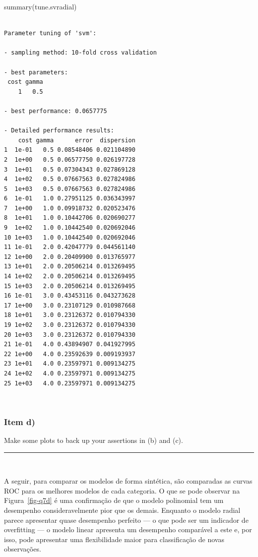 \documentclass[
  a4paperpaper,
]{article}
\newenvironment{Shaded}{\begin{snugshade}}{\end{snugshade}}
\newcommand{\FunctionTok}[1]{\textcolor[rgb]{0.28,0.35,0.67}{#1}}
\newcommand{\NormalTok}[1]{\textcolor[rgb]{0.00,0.23,0.31}{#1}}
\begin{document}
\begin{Shaded}
\begin{Highlighting}[]
\FunctionTok{summary}\NormalTok{(tune.svradial)}
\end{Highlighting}
\end{Shaded}

\begin{verbatim}

Parameter tuning of 'svm':

- sampling method: 10-fold cross validation 

- best parameters:
 cost gamma
    1   0.5

- best performance: 0.0657775 

- Detailed performance results:
    cost gamma      error  dispersion
1  1e-01   0.5 0.08548406 0.021104890
2  1e+00   0.5 0.06577750 0.026197728
3  1e+01   0.5 0.07304343 0.027869128
4  1e+02   0.5 0.07667563 0.027824986
5  1e+03   0.5 0.07667563 0.027824986
6  1e-01   1.0 0.27951125 0.036343997
7  1e+00   1.0 0.09918732 0.020523476
8  1e+01   1.0 0.10442706 0.020690277
9  1e+02   1.0 0.10442540 0.020692046
10 1e+03   1.0 0.10442540 0.020692046
11 1e-01   2.0 0.42047779 0.044561140
12 1e+00   2.0 0.20409900 0.013765977
13 1e+01   2.0 0.20506214 0.013269495
14 1e+02   2.0 0.20506214 0.013269495
15 1e+03   2.0 0.20506214 0.013269495
16 1e-01   3.0 0.43453116 0.043273628
17 1e+00   3.0 0.23107129 0.010987668
18 1e+01   3.0 0.23126372 0.010794330
19 1e+02   3.0 0.23126372 0.010794330
20 1e+03   3.0 0.23126372 0.010794330
21 1e-01   4.0 0.43894907 0.041927995
22 1e+00   4.0 0.23592639 0.009193937
23 1e+01   4.0 0.23597971 0.009134275
24 1e+02   4.0 0.23597971 0.009134275
25 1e+03   4.0 0.23597971 0.009134275
\end{verbatim}

~

\subsubsection{Item d)}\label{item-d-3}

Make some plots to back up your assertions in (b) and (c).

\begin{center}\rule{0.5\linewidth}{0.5pt}\end{center}

~

A seguir, para comparar os modelos de forma sintética, são comparadas as
curvas ROC para os melhores modelos de cada categoria. O que se pode
observar na Figura~\ref{fig-q7d} é uma confirmação de que o modelo
polinomial tem um desempenho consideravelmente pior que os demais.
Enquanto o modelo radial parece apresentar quase desempenho perfeito ---
o que pode ser um indicador de overfitting --- o modelo linear apresenta
um desempenho comparável a este e, por isso, pode apresentar uma
flexibilidade maior para classificação de novas observações.
\end{document}
